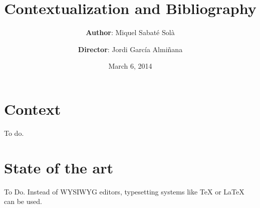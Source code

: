 \documentclass[a4paper,12pt]{article}
\title{\bf Contextualization and Bibliography}
\author{
  {\bf Author}: Miquel Sabaté Solà
  \and
  {\bf Director}: Jordi García Almiñana
}
\date{March 6, 2014}
\begin{document}
\clearpage\maketitle

\setcounter{page}{1}
\section{Context}

To do.

\section{State of the art}

To Do.
Instead of WYSIWYG editors, typesetting systems like \TeX{} or \LaTeX{}
\cite{greenwade93} can be used.



\end{document}
